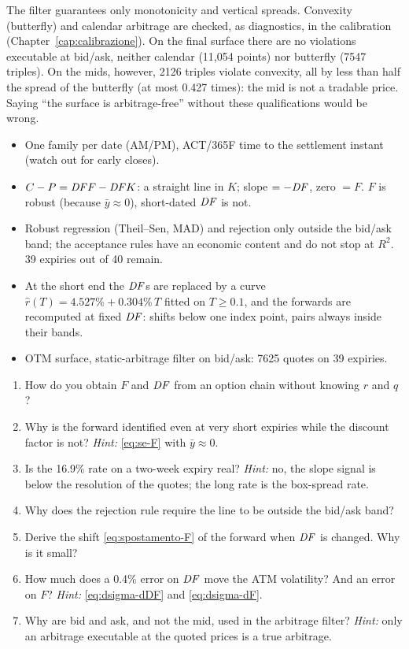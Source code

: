 \begin{attenzione}
The filter guarantees only monotonicity and vertical spreads. Convexity (butterfly) and calendar arbitrage are
checked, as diagnostics, in the calibration (Chapter~\ref{cap:calibrazione}). On the final surface there are no
violations executable at bid/ask, neither calendar (11{,}054 points) nor butterfly (7547 triples). On the mids,
however, 2126 triples violate convexity, all by less than half the spread of the butterfly (at most 0.427 times): the
mid is not a tradable price. Saying ``the surface is arbitrage-free'' without these qualifications would be wrong.
\end{attenzione}

\begin{riassunto}
\begin{itemize}
\item One family per date (AM/PM), ACT/365F time to the settlement instant (watch out for early closes).
\item $C-P=\mathit{DF} F-\mathit{DF} K$: a straight line in $K$; slope $=-\mathit{DF}$, zero $=F$. $F$ is robust (because $\bar y\approx0$),
short-dated $\mathit{DF}$ is not.
\item Robust regression (Theil--Sen, MAD) and rejection only outside the bid/ask band; the acceptance rules have an
economic content and do not stop at $R^2$. 39 expiries out of 40 remain.
\item At the short end the $\mathit{DF}$s are replaced by a curve $\hat r(T)=4.527\%+0.304\%\,T$ fitted on $T\ge0.1$, and the
forwards are recomputed at fixed $\mathit{DF}$: shifts below one index point, pairs always inside their bands.
\item OTM surface, static-arbitrage filter on bid/ask: 7625 quotes on 39 expiries.
\end{itemize}
\end{riassunto}

\begin{domande}
\begin{enumerate}
\item How do you obtain $F$ and $\mathit{DF}$ from an option chain without knowing $r$ and $q$?
\item Why is the forward identified even at very short expiries while the discount factor is not? \emph{Hint:}
\eqref{eq:se-F} with $\bar y\approx0$.
\item Is the 16.9\% rate on a two-week expiry real? \emph{Hint:} no, the slope signal is below the resolution of the
quotes; the long rate is the box-spread rate.
\item Why does the rejection rule require the line to be outside the bid/ask band?
\item Derive the shift \eqref{eq:spostamento-F} of the forward when $\mathit{DF}$ is changed. Why is it small?
\item How much does a 0.4\% error on $\mathit{DF}$ move the ATM volatility? And an error on $F$? \emph{Hint:}
\eqref{eq:dsigma-dDF} and \eqref{eq:dsigma-dF}.
\item Why are bid and ask, and not the mid, used in the arbitrage filter? \emph{Hint:} only an arbitrage executable at
the quoted prices is a true arbitrage.
\end{enumerate}
\end{domande}
